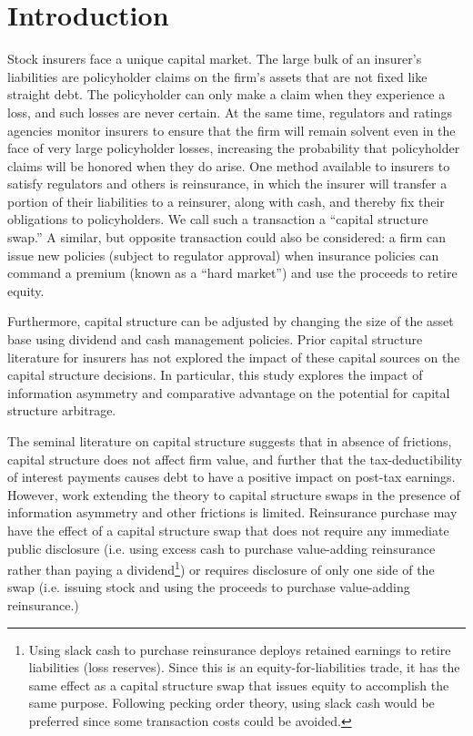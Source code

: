 \section{Introduction}\label{sec:intro}

Stock insurers face a unique capital market. The large bulk of an insurer's liabilities are policyholder claims on the firm's assets that are not fixed like straight debt. The policyholder can only make a claim when they experience a loss, and such losses are never certain. At the same time, regulators and ratings agencies monitor insurers to ensure that the firm will remain solvent even in the face of very large policyholder losses, increasing the probability that policyholder claims will be honored when they do arise.  One method available to insurers to satisfy regulators and others is reinsurance, in which the insurer will transfer a portion of their liabilities to a reinsurer, along with cash, and thereby fix their obligations to policyholders. We call such a transaction a ``capital structure swap.'' A similar, but opposite transaction could also be considered: a firm can issue new policies (subject to regulator approval) when insurance policies can command a premium (known as a ``hard market'') and use the proceeds to retire equity.

Furthermore, capital structure can be adjusted by changing the size of the asset base using dividend and cash management policies. Prior capital structure literature for insurers has not explored the impact of these capital sources on the capital structure decisions. In particular, this study explores the impact of information asymmetry and comparative advantage on the potential for capital structure arbitrage.

The seminal literature on capital structure \citep{modigliani1958a,modigliani1963a} suggests that in absence of frictions, capital structure does not affect firm value, and further that the tax-deductibility of interest payments causes debt to have a positive impact on post-tax earnings. However, work extending the theory to capital structure swaps in the presence of information asymmetry and other frictions is limited. Reinsurance purchase may have the effect of a capital structure swap that does not require any immediate public disclosure (i.e. using excess cash to purchase value-adding reinsurance rather than paying a dividend\footnote{Using slack cash to purchase reinsurance deploys retained earnings to retire liabilities (loss reserves).  Since this is an equity-for-liabilities trade, it has the same effect as a capital structure swap that issues equity to accomplish the same purpose. Following pecking order theory, using slack cash would be preferred since some transaction costs could be avoided.}) or requires disclosure of only one side of the swap (i.e. issuing stock and using the proceeds to purchase value-adding reinsurance.)

